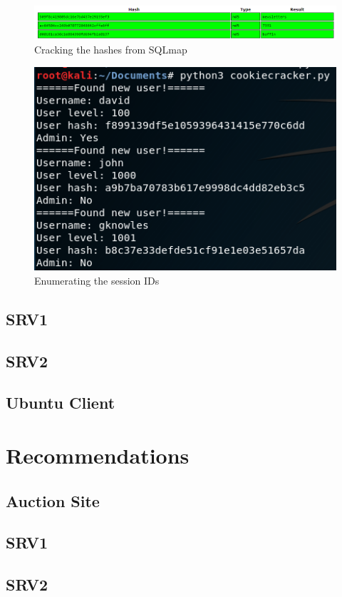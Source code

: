 \documentclass{report}
\begin{document}
\begin{figure}[!htb]
	\centering
	\includegraphics[scale=0.5]{img/crackstation.png}
	\caption{Cracking the hashes from SQLmap}
\end{figure}
\begin{figure}[!htb]
	\centering
	\includegraphics[scale=0.6]{img/cookie1.png}
	\caption{Enumerating the session IDs}
\end{figure}
\section{SRV1}
\section{SRV2}
\section{Ubuntu Client}

\chapter{Recommendations}
\section{Auction Site}
\section{SRV1}
\section{SRV2}
\end{document}
